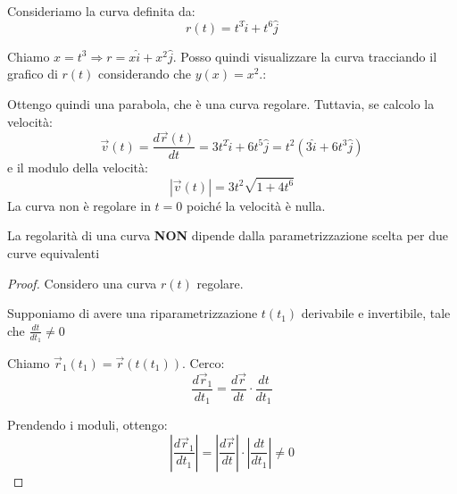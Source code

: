 \begin{example}
    Consideriamo la curva definita da:
    \begin{equation*}
        r(t)=t^3 \hat i + t^6 \hat j
    \end{equation*}

    Chiamo $x=t^3 \Rightarrow r=x \hat i + x^2 \hat j$. Posso quindi visualizzare la curva tracciando il grafico di $r(t)$ considerando che $y(x)=x^2$.:
    \begin{figure}[H]
        \centering
    \end{figure}

    Ottengo quindi una parabola, che è una curva regolare. Tuttavia, se calcolo la velocità:
    \begin{equation*}
        \vec v(t) = \frac{d \vec r(t)}{dt} = 3t^2 \hat i + 6t^5 \hat j= t^2(3\hat i + 6t^3 \hat j)
    \end{equation*}
    e il modulo della velocità:
    \begin{equation*}
        |\vec v(t)| = 3t^2 \sqrt{1 + 4t^6}
    \end{equation*}
    La curva non è regolare in $t=0$ poiché la velocità è nulla.
\end{example}

\begin{theorem}\label{th:regolarita_equivalente}
    La regolarità di una curva \textbf{NON} dipende dalla parametrizzazione scelta per due curve equivalenti
\end{theorem}

\begin{proof}
    Considero una curva $r(t)$ regolare.

    Supponiamo di avere una riparametrizzazione $t(t_1)$ derivabile e invertibile, tale che $\frac{dt}{dt_1} \neq 0$

    Chiamo $\vec r_1(t_1) = \vec r(t(t_1))$. Cerco:
    \begin{equation*}
        \frac{d \vec r_1}{dt_1}=\frac{d \vec r}{dt}\cdot \frac{dt}{dt_1}
    \end{equation*}

    Prendendo i moduli, ottengo:
    \begin{equation*}
        \left| \frac{d \vec r_1}{dt_1} \right| = \left| \frac{d \vec r}{dt} \right| \cdot \left| \frac{dt}{dt_1} \right| \neq 0
    \end{equation*}
\end{proof}

